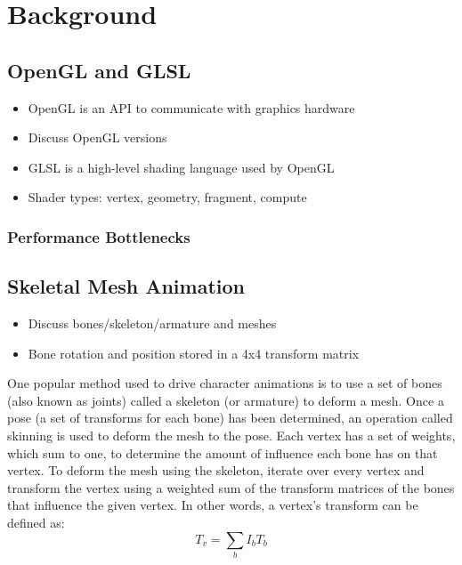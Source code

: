 \section{Background}

\subsection{OpenGL and GLSL}
\ifsummaries
\begin{itemize}
 \item OpenGL is an API to communicate with graphics hardware
 \item Discuss OpenGL versions
 \item GLSL is a high-level shading language used by OpenGL
 \item Shader types: vertex, geometry, fragment, compute
\end{itemize}
\fi


\subsubsection{Performance Bottlenecks}


\subsection{Skeletal Mesh Animation}
\ifsummaries
\begin{itemize}
 \item Discuss bones/skeleton/armature and meshes
 \item Bone rotation and position stored in a 4x4 transform matrix
\end{itemize}
\fi

One popular method used to drive character animations is to use a set of bones (also known as joints) called a skeleton (or armature) to deform a mesh.
Once a pose (a set of transforms for each bone) has been determined, an operation called skinning is used to deform the mesh to the pose.
Each vertex has a set of weights, which sum to one, to determine the amount of influence each bone has on that vertex.
To deform the mesh using the skeleton, iterate over every vertex and transform the vertex using a weighted sum of the transform matrices of the bones that influence the given vertex.
In other words, a vertex's transform can be defined as:
\begin{equation}
 \label{eq:skinning}
 T_v = \sum_b{I_bT_b}
\end{equation}

